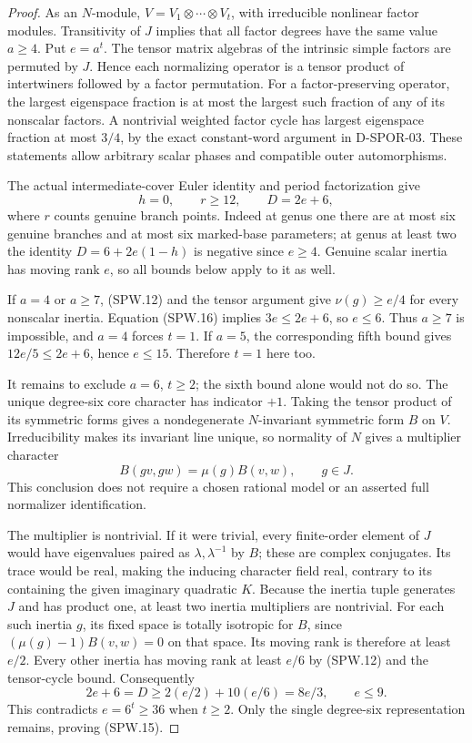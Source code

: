 \begin{proof}
As an $N$-module,
$V=V_1\otimes\cdots\otimes V_t$, with irreducible nonlinear
factor modules.  Transitivity of $J$ implies that all factor
degrees have the same value $a\ge4$.  Put $e=a^t$.
The tensor matrix algebras of the intrinsic simple factors
are permuted by $J$.  Hence each normalizing operator is a
tensor product of intertwiners followed by a factor permutation.
For a factor-preserving operator, the largest eigenspace
fraction is at most the largest such fraction of any of its
nonscalar factors.  A nontrivial weighted factor cycle has
largest eigenspace fraction at most $3/4$, by the exact
constant-word argument in D-SPOR-03.  These statements allow
arbitrary scalar phases and compatible outer automorphisms.

The actual intermediate-cover Euler identity and period
factorization give
\[
             h=0,\qquad r\ge12,\qquad D=2e+6,              \tag{SPW.16}
\]
where $r$ counts genuine branch points.  Indeed at genus one
there are at most six genuine branches and at most six
marked-base parameters; at genus at least two the identity
$D=6+2e(1-h)$ is negative since $e\ge4$.  Genuine scalar
inertia has moving rank $e$, so all bounds below apply to it
as well.

If $a=4$ or $a\ge7$, (SPW.12) and the tensor argument give
$\nu(g)\ge e/4$ for every nonscalar inertia.  Equation
(SPW.16) implies $3e\le2e+6$, so $e\le6$.  Thus $a\ge7$
is impossible, and $a=4$ forces $t=1$.
If $a=5$, the corresponding fifth bound gives
$12e/5\le2e+6$, hence $e\le15$.  Therefore $t=1$ here too.

It remains to exclude $a=6$, $t\ge2$; the sixth bound alone
would not do so.  The unique degree-six core character has
indicator $+1$.  Taking the tensor product of its symmetric
forms gives a nondegenerate $N$-invariant symmetric form $B$
on $V$.  Irreducibility makes its invariant line unique, so
normality of $N$ gives a multiplier character
\[
                  B(gv,gw)=\mu(g)B(v,w),\qquad g\in J.
\]
This conclusion does not require a chosen rational model or
an asserted full normalizer identification.

The multiplier is nontrivial.  If it were trivial, every
finite-order element of $J$ would have eigenvalues paired
as $\lambda,\lambda^{-1}$ by $B$; these are complex
conjugates.  Its trace would be real, making the inducing
character field real, contrary to its containing the given
imaginary quadratic $K$.
Because the inertia tuple generates $J$ and has product one,
at least two inertia multipliers are nontrivial.  For each
such inertia $g$, its fixed space is totally isotropic for
$B$, since
$(\mu(g)-1)B(v,w)=0$ on that space.  Its moving rank is
therefore at least $e/2$.
Every other inertia has moving rank at least $e/6$ by
(SPW.12) and the tensor-cycle bound.  Consequently
\[
             2e+6=D\ge 2(e/2)+10(e/6)=8e/3,
             \qquad e\le9.                               \tag{SPW.17}
\]
This contradicts $e=6^t\ge36$ when $t\ge2$.
Only the single degree-six representation remains, proving
(SPW.15).


\end{proof}
